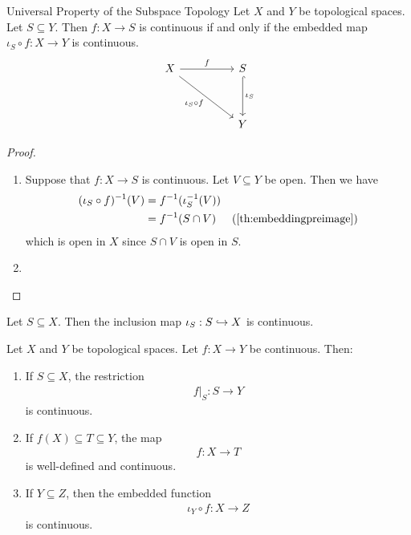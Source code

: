 \begin{importanttheorem}{Universal Property of the Subspace Topology}{}
	Let $X$ and $Y$ be topological spaces. Let $S \subseteq Y$. Then $f : X \to S$ is continuous if and only if the embedded map $\iota_S \circ f : X \to Y$ is continuous.
	\[\begin{tikzcd}
		X && S \\
		\\
		&& Y
		\arrow["f", from=1-1, to=1-3]
		\arrow["{\iota_S \circ f}"', from=1-1, to=3-3]
		\arrow["{\iota_S}", hook, from=1-3, to=3-3]
	\end{tikzcd}\]
\end{importanttheorem}
\begin{proof}
	\begin{enumerate}
		\item[$\Rightarrow$:] Suppose that $f : X \to S$ is continuous. Let $V \subseteq Y$ be open. Then we have
		\begin{align*}
			(\iota_S \circ f)^{-1}(V) 
			&= f^{-1}(\iota_S^{-1}(V))\\
			&= f^{-1}(S \cap V) &(\ref{th:embeddingpreimage})
		\end{align*}
		which is open in $X$ since $S \cap V$ is open in $S$.
		\item[$\Leftarrow$:]
	\end{enumerate}
\end{proof}
\begin{corollary}
	Let $S \subseteq X$. Then the inclusion map $\iota_S : S \hookrightarrow X$ is continuous.
\end{corollary}
\begin{corollary}
	Let $X$ and $Y$ be topological spaces. Let $f : X \to Y$ be continuous. Then:
	\begin{enumerate}
		\item If $S \subseteq X$, the restriction
		\begin{align*}
			f|_S : S \to Y
		\end{align*}
		is continuous.
		\item If $f(X) \subseteq T \subseteq Y$, the map
		\begin{align*}
			f : X \to T
		\end{align*}
		is well-defined and continuous.
		\item If $Y \subseteq Z$, then the embedded function
		\begin{align*}
			\iota_Y \circ f : X \to Z
		\end{align*}
		is continuous.
	\end{enumerate}
\end{corollary}
